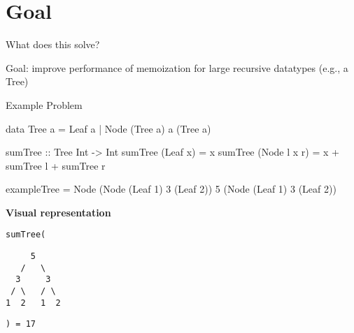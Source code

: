 \section{Goal}

\begin{slide}{What does this solve?}

Goal: improve performance of memoization for large recursive datatypes (e.g., a Tree)

\end{slide}


\begin{slide}{Example Problem}
\begin{haskell}
data Tree a = Leaf a | Node (Tree a) a (Tree a)

sumTree :: Tree Int -> Int
sumTree (Leaf x)     = x
sumTree (Node l x r) = x + sumTree l + sumTree r

exampleTree = Node (Node (Leaf 1) 3 (Leaf 2)) 5 (Node (Leaf 1) 3 (Leaf 2))
\end{haskell}

\begin{center}
\textbf{Visual representation}

\begin{minipage}{.1\textwidth}
\texttt{sumTree(}
\end{minipage}
\begin{minipage}{.2\textwidth}
\begin{center}
\begin{verbatim}
     5 
   /   \
  3     3
 / \   / \
1  2   1  2
\end{verbatim}
\end{center}
\end{minipage}
\begin{minipage}{.1\textwidth}
\texttt{) = 17}
\end{minipage}
\end{center}
\end{slide}


